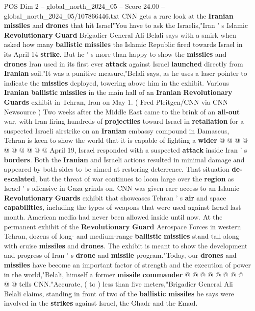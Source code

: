 \begin{textsample}{POS Dim 2 – global\_north\_2024\_05 – Score 24.00 – global\_north\_2024\_05/107866446.txt}  \label{ex:f2_pos_382}
CNN gets a rare look at the \textbf{Iranian} \textbf{missiles} and \textbf{drones} that hit Israel"You have to ask the Israelis,"Iran ' s Islamic \textbf{Revolutionary} \textbf{Guard} Brigadier General Ali Belali says with a smirk when asked how many \textbf{ballistic} \textbf{missiles} the Islamic Republic fired towards Israel in its April 14 \textbf{strike}.
But he ' s more than happy to show the \textbf{missiles} and \textbf{drones} Iran used in its first ever \textbf{attack} against Israel \textbf{launched} directly from \textbf{Iranian} soil."It was a punitive measure,"Belali says, as he uses a laser pointer to indicate the \textbf{missiles} deployed, towering above him in the exhibit.
Various \textbf{Iranian} \textbf{ballistic} \textbf{missiles} in the main hall of an \textbf{Iranian} \textbf{Revolutionary} \textbf{Guards} exhibit in Tehran, Iran on May 1. ( Fred Pleitgen/CNN via CNN Newsource ) Two weeks after the Middle East came to the brink of an \textbf{all-out} war, with Iran firing hundreds of \textbf{projectiles} toward Israel in \textbf{retaliation} for a suspected Israeli airstrike on an \textbf{Iranian} embassy compound in Damascus, Tehran is keen to show the world that it is capable of fighting a \textbf{wider} @ @ @ @ @ @ @ @ @ @ April 19, Israel responded with a suspected \textbf{attack} inside Iran ' s \textbf{borders}.
Both the \textbf{Iranian} and Israeli actions resulted in minimal damage and appeared by both sides to be aimed at restoring deterrence.
That situation \textbf{de-escalated}, but the threat of war continues to loom large over the \textbf{region} as Israel ' s offensive in Gaza grinds on.
CNN was given rare access to an Islamic \textbf{Revolutionary} \textbf{Guards} exhibit that showcases Tehran ' s \textbf{air} and space \textbf{capabilities}, including the types of weapons that were used against Israel last month.
American media had never been allowed inside until now.
At the permanent exhibit of the \textbf{Revolutionary} \textbf{Guard} Aerospace Forces in western Tehran, dozens of long- and medium-range \textbf{ballistic} \textbf{missiles} stand tall along with cruise \textbf{missiles} and \textbf{drones}.
The exhibit is meant to show the development and progress of Iran ' s \textbf{drone} and \textbf{missile} program."Today, our \textbf{drones} and \textbf{missiles} have become an important factor of strength and the execution of power in the world,"Belali, himself a former \textbf{missile} \textbf{commander} @ @ @ @ @ @ @ @ @ @ tells CNN."Accurate, ( to ) less than five meters,"Brigadier General Ali Belali claims, standing in front of two of the \textbf{ballistic} \textbf{missiles} he says were involved in the \textbf{strikes} against Israel, the Ghadr and the Emad.

\end{textsample}
